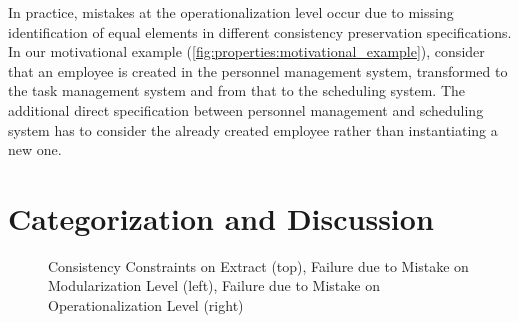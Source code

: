 In practice, mistakes at the operationalization level occur due to missing identification of equal elements in different consistency preservation specifications. 
In our motivational example (\autoref{fig:properties:motivational_example}), %
consider that an employee is created in the personnel management system, transformed to the task management system and from that to the scheduling system.
The additional direct specification between personnel management and scheduling system has to consider the already created employee rather than instantiating a new one.




\section{Categorization and Discussion}
\label{sec:classification:categorization}

\begin{figure}[tb]
    \centering
    
    \caption{Consistency Constraints on \Metamodel Extract (top), Failure due to Mistake on Modularization Level (left), Failure due to Mistake on Operationalization Level (right)}
    \label{fig:correctness:mistake_effects_example}
\end{figure}

